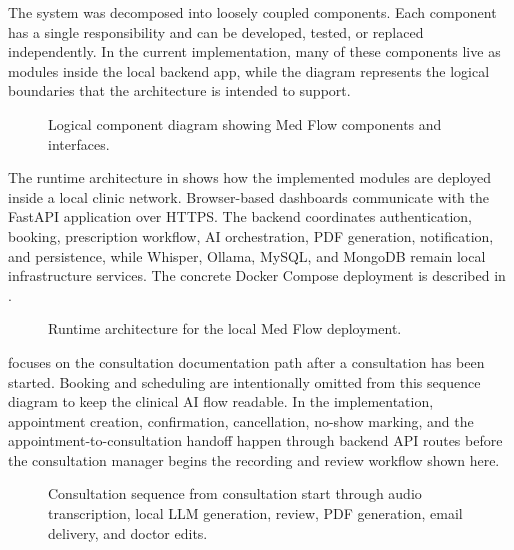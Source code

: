The system was decomposed into loosely coupled components. Each component has a single responsibility and can be developed, tested, or replaced independently. In the current implementation, many of these components live as modules inside the local backend app, while the diagram represents the logical boundaries that the architecture is intended to support.

\begin{figure}[htbp]
\centering
{}
\caption{Logical component diagram showing Med Flow components and interfaces.}
\label{fig:component-diagram}
\end{figure}
\FloatBarrier

The runtime architecture in  shows how the implemented modules are deployed inside a local clinic network. Browser-based dashboards communicate with the FastAPI application over HTTPS. The backend coordinates authentication, booking, prescription workflow, AI orchestration, PDF generation, notification, and persistence, while Whisper, Ollama, MySQL, and MongoDB remain local infrastructure services. The concrete Docker Compose deployment is described in .

\begin{figure}[htbp]
\centering
{}
\caption{Runtime architecture for the local Med Flow deployment.}
\label{fig:runtime-architecture}
\end{figure}
\FloatBarrier

 focuses on the consultation documentation path after a consultation has been started. Booking and scheduling are intentionally omitted from this sequence diagram to keep the clinical AI flow readable. In the implementation, appointment creation, confirmation, cancellation, no-show marking, and the appointment-to-consultation handoff happen through backend API routes before the consultation manager begins the recording and review workflow shown here.

\begin{figure}[p]
\centering
{}
\caption{Consultation sequence from consultation start through audio transcription, local LLM generation, review, PDF generation, email delivery, and doctor edits.}
\label{fig:consultation-sequence}
\end{figure}
\FloatBarrier

